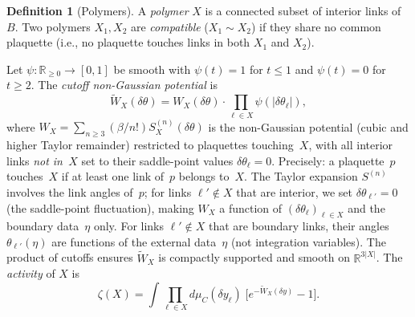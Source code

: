 \documentclass[11pt]{article}
\theoremstyle{definition}
\newtheorem{definition}[theorem]{Definition}
\newcommand{\R}{\mathbb{R}}
\begin{document}
\begin{definition}[Polymers]\label{def:polymer}
A \emph{polymer} $X$ is a connected subset of interior links of $B$.
Two polymers $X_1,X_2$ are \emph{compatible} ($X_1\sim X_2$) if they
share no common plaquette (i.e., no plaquette touches links in both
$X_1$ and $X_2$).

Let $\psi:\R_{\ge 0}\to[0,1]$ be smooth with $\psi(t)=1$ for $t\le 1$
and $\psi(t)=0$ for $t\ge 2$.  The \emph{cutoff non-Gaussian potential}
is
\begin{equation}
\widetilde{W}_X(\delta\theta)
=W_X(\delta\theta)\cdot\prod_{\ell\in X}\psi(|\delta\theta_\ell|),
\end{equation}
where $W_X=\sum_{n\ge 3}(\beta/n!)S_X^{(n)}(\delta\theta)$ is the
non-Gaussian potential (cubic and higher Taylor remainder)
restricted to plaquettes touching~$X$, with all interior links
\emph{not in~$X$} set to their saddle-point values
$\delta\theta_\ell=0$.  Precisely: a plaquette~$p$ touches~$X$
if at least one link of~$p$ belongs to~$X$.  The Taylor
expansion $S^{(n)}$ involves the link angles of~$p$; for
links $\ell'\notin X$ that are interior, we set
$\delta\theta_{\ell'}=0$ (the saddle-point fluctuation),
making $W_X$ a function of $(\delta\theta_\ell)_{\ell\in X}$
and the boundary data~$\eta$ only.  For links $\ell'\notin X$
that are boundary links, their angles $\theta_{\ell'}(\eta)$
are functions of the external data~$\eta$ (not integration
variables).  The product of
cutoffs ensures $\widetilde{W}_X$ is compactly supported and smooth
on $\R^{3|X|}$.  The \emph{activity} of $X$ is
\begin{equation}\label{eq:activity-def}
\zeta(X)=\int\prod_{\ell\in X}d\mu_C(\delta y_\ell)\;
\bigl[e^{-\widetilde{W}_X(\delta y)}-1\bigr].
\end{equation}
\end{definition}
\end{document}
